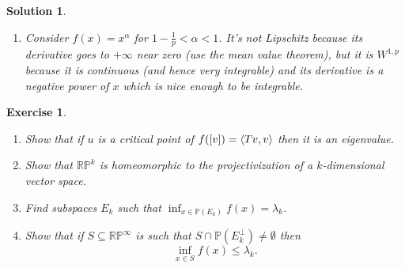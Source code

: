 \documentclass{article}
\newtheorem{ex}{Exercise}
\theoremstyle{nonumberplain}
\newtheorem{sol}{Solution}
\newcommand{\R}{\mathbb{R}}
\newcommand{\PP}{\mathbb{P}}
\DeclarePairedDelimiter{\braket}{\langle}{\rangle}
\begin{document}
\begin{sol}
\begin{enumerate}
Thus, setting $a = \int_0^1  (f-g)$ (which, recall, is well-defined because $f-g \in L^p \subseteq L^1$) we obtain as desired
\begin{equation}
\int_0^1 (f-g-a)\beta = 0.
\end{equation}

\item Consider $f(x) = x^\alpha$ for $1 - \frac1p < \alpha < 1$. It's not Lipschitz because its derivative goes to $+\infty$ near zero (use the mean value theorem), but it is $W^{1,p}$ because it is continuous (and hence very integrable) and its derivative is a negative power of $x$ which is nice enough to be integrable.
\end{enumerate}
\end{sol}

\begin{ex}
\leavevmode
\begin{enumerate}
\item Show that if $u$ is a critical point of $f([v]) = \braket{Tv,v}$ then it is an eigenvalue.
\item Show that $\R\PP^k$ is homeomorphic to the projectivization of a $k$-dimensional vector space.
\item Find subspaces $E_k$ such that $\inf_{x \in \PP(E_k)} f(x) = \lambda_k$.
\item Show that if $S \subseteq \R\PP^\infty$ is such that $S \cap \PP(E_k^\perp) \neq \emptyset$ then
\begin{equation}
\inf_{x \in S} f(x) \leq \lambda_k.
\end{equation}
\end{enumerate}
\end{ex}
\end{document}
